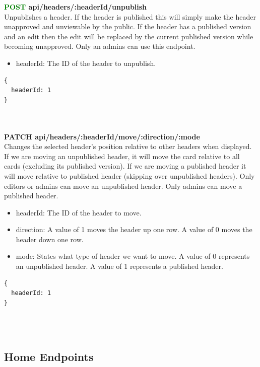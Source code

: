 \documentclass[onecolumn, draftclsnofoot,10pt, compsoc, usenames, dvipsnames]{IEEEtran}
\begin{document}
\noindent
\textbf{\textcolor{Green}{POST} api/headers/:headerId/unpublish} \\
Unpublishes a header. If the header is published this will simply make the header unapproved and unviewable by the public. If the header has a published version and an edit then the edit will  be replaced by the current published version while becoming unapproved. Only an admins can use this endpoint.
\begin{itemize}
    \item headerId: The ID of the header to unpublish.
\end{itemize}
\begin{lstlisting}[caption=Example Response]
{ 
  headerId: 1
}
\end{lstlisting}
\\~\\


\noindent
\textbf{\textcolor{BlueGreen}{PATCH} api/headers/:headerId/move/:direction/:mode} \\
Changes the selected header's position relative to other headers when displayed. If we are moving an unpublished header, it will move the card relative to all cards (excluding its published version). If we are moving a published header it will move relative to published header (skipping over unpublished headers). Only editors or admins can move an unpublished header. Only admins can move a published header.
\begin{itemize}
    \item headerId: The ID of the header to move.
    \item direction: A value of 1 moves the header up one row. A value of 0 moves the header down one row.
    \item mode: States what type of header we want to move. A value of 0 represents an unpublished header. A value of 1 represents a published header.
\end{itemize}
\begin{lstlisting}[caption=Example Response]
{ 
  headerId: 1
}
\end{lstlisting}
\\~\\


\subsection{Home Endpoints}
\end{document}
